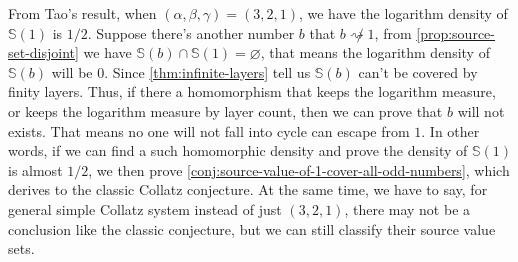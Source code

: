 
From Tao's result\cite{tao2022orbitscollatzmapattain}, when $(\alpha, \beta, \gamma) = (3, 2, 1)$, we have the logarithm density of $\mathbb{S}(1)$ is $1/2$. Suppose there's another number $b$ that $b \not\rightsquigarrow 1$, from \cref{prop:source-set-disjoint} we have $\mathbb{S}(b)\cap\mathbb{S}(1) = \varnothing$, that means the logarithm density of $\mathbb{S}(b)$ will be $0$. Since \cref{thm:infinite-layers} tell us $\mathbb{S}(b)$ can't be covered by finity layers. Thus, if there a homomorphism that keeps the logarithm measure, or keeps the logarithm measure by layer count, then we can prove that $b$ will not exists. That means no one will not fall into cycle can escape from $1$.
In other words, if we can find a such homomorphic density and prove the density of $\mathbb{S}(1)$ is almost $1/2$, we then prove \cref{conj:source-value-of-1-cover-all-odd-numbers}, which derives to the classic Collatz conjecture.
At the same time, we have to say, for general simple Collatz system instead of just $(3,2,1)$, there may not be a conclusion like the classic conjecture, but we can still classify their source value sets.

